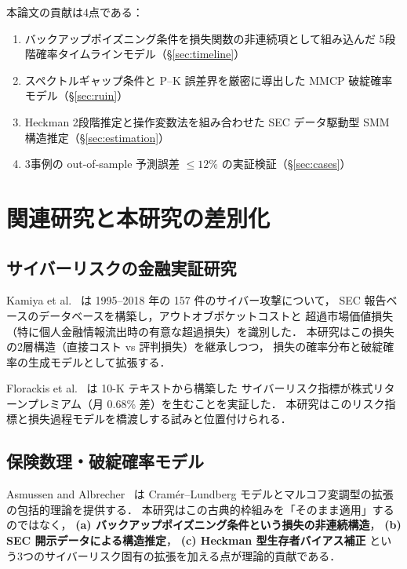 \documentclass{ipsjlike}
\begin{document}
本論文の貢献は4点である：
\begin{enumerate}[leftmargin=1.5em, topsep=2pt, itemsep=2pt]
  \item バックアップポイズニング条件を損失関数の非連続項として組み込んだ
    5段階確率タイムラインモデル（§\ref{sec:timeline}）
  \item スペクトルギャップ条件と P--K 誤差界を厳密に導出した
    MMCP 破綻確率モデル（§\ref{sec:ruin}）
  \item Heckman 2段階推定と操作変数法を組み合わせた
    SEC データ駆動型 SMM 構造推定（§\ref{sec:estimation}）
  \item 3事例の out-of-sample 予測誤差 $\leq 12\%$ の実証検証（§\ref{sec:cases}）
\end{enumerate}

\section{関連研究と本研究の差別化}
\label{sec:related}

\subsection{サイバーリスクの金融実証研究}

Kamiya et al.~\cite{kamiya2021jfe} は 1995--2018 年の 157 件のサイバー攻撃について，
SEC 報告ベースのデータベースを構築し，アウトオブポケットコストと
超過市場価値損失（特に個人金融情報流出時の有意な超過損失）を識別した．
本研究はこの損失の2層構造（直接コスト vs 評判損失）を継承しつつ，
損失の確率分布と破綻確率の生成モデルとして拡張する．

Florackis et al.~\cite{florackis2023rfs} は 10-K テキストから構築した
サイバーリスク指標が株式リターンプレミアム（月 0.68\% 差）を生むことを実証した．
本研究はこのリスク指標と損失過程モデルを橋渡しする試みと位置付けられる．

\subsection{保険数理・破綻確率モデル}

Asmussen and Albrecher~\cite{asmussen2010ruin} は
Cram\'{e}r--Lundberg モデルとマルコフ変調型の拡張の包括的理論を提供する．
本研究はこの古典的枠組みを「そのまま適用」するのではなく，
\textbf{(a) バックアップポイズニング条件という損失の非連続構造}，
\textbf{(b) SEC 開示データによる構造推定}，
\textbf{(c) Heckman 型生存者バイアス補正}
という3つのサイバーリスク固有の拡張を加える点が理論的貢献である．
\end{document}
